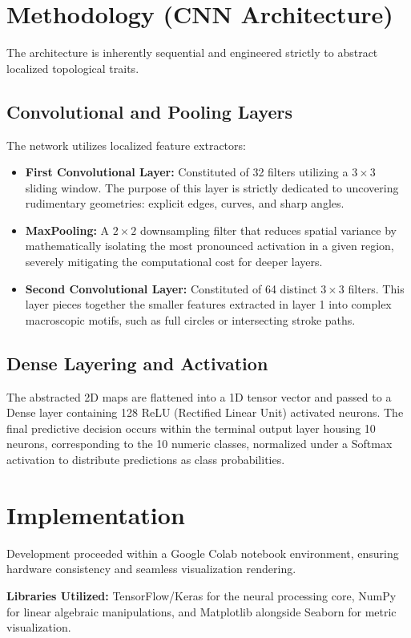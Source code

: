 \documentclass[12pt,a4paper]{article}
\begin{document}
\section{Methodology (CNN Architecture)}
The architecture is inherently sequential and engineered strictly to abstract localized topological traits. 

\subsection{Convolutional and Pooling Layers}
The network utilizes localized feature extractors:
\begin{itemize}
    \item \textbf{First Convolutional Layer:} Constituted of 32 filters utilizing a $3 \times 3$ sliding window. The purpose of this layer is strictly dedicated to uncovering rudimentary geometries: explicit edges, curves, and sharp angles.
    \item \textbf{MaxPooling:} A $2 \times 2$ downsampling filter that reduces spatial variance by mathematically isolating the most pronounced activation in a given region, severely mitigating the computational cost for deeper layers. 
    \item \textbf{Second Convolutional Layer:} Constituted of 64 distinct $3 \times 3$ filters. This layer pieces together the smaller features extracted in layer 1 into complex macroscopic motifs, such as full circles or intersecting stroke paths.
\end{itemize}

\subsection{Dense Layering and Activation}
The abstracted 2D maps are flattened into a 1D tensor vector and passed to a Dense layer containing 128 ReLU (Rectified Linear Unit) activated neurons. The final predictive decision occurs within the terminal output layer housing 10 neurons, corresponding to the 10 numeric classes, normalized under a Softmax activation to distribute predictions as class probabilities.

\section{Implementation}
Development proceeded within a Google Colab notebook environment, ensuring hardware consistency and seamless visualization rendering. 

\textbf{Libraries Utilized:} TensorFlow/Keras for the neural processing core, NumPy for linear algebraic manipulations, and Matplotlib alongside Seaborn for metric visualization.
\end{document}
